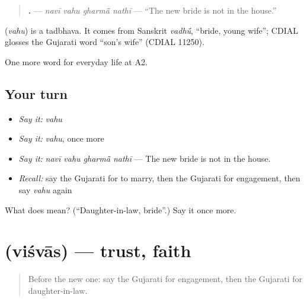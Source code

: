 \begin{quote}
\textbf{   .} — \emph{navī vahu gharmā̃ nathī} — \textquotedblleft{}The new bride is not in the house.\textquotedblright{}
\end{quote}

\begin{cousinweb}
\textbf{} (\emph{vahu}) is a tadbhava. It comes from Sanskrit \emph{vadhū́}, \textquotedblleft{}bride, young wife\textquotedblright{}; CDIAL glosses the Gujarati word \textquotedblleft{}son's wife\textquotedblright{} (CDIAL 11250).
\end{cousinweb}

\begin{grammarlens}[title={What you've built}]
One more word for everyday life at A2.
\end{grammarlens}

\subsection*{Your turn}
\begin{itemize}
\raggedright
  \item \emph{Say it:} \emph{vahu}
  \item \emph{Say it:} \emph{vahu}, once more
  \item \emph{Say it:} \emph{navī vahu gharmā̃ nathī} — The new bride is not in the house.
  \item \emph{Recall:} say the Gujarati for to marry, then the Gujarati for engagement, then say \emph{vahu} again
\end{itemize}

\begin{tcolorbox}[breakable,colback=teal!4,colframe=teal!35!black,title={Before you move on}]
What does  mean? (\textquotedblleft{}Daughter-in-law, bride\textquotedblright{}.) Say it once more.
\end{tcolorbox}
\section[\texorpdfstring{\gu{વિશ્વાસ} (viśvās)}{વિશ્વાસ (viśvās)}]{ (viśvās) — trust, faith}

\label{lesson:GU-C265-vishvas}



\begin{quote}
Before the new one: say the Gujarati for engagement, then the Gujarati for daughter-in-law.
\end{quote}

